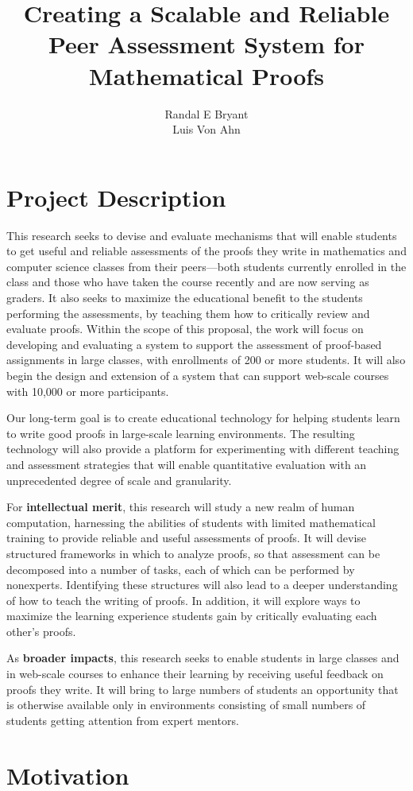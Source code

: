 \documentclass[12pt]{article}
\title{Creating a Scalable and Reliable Peer Assessment System for
  Mathematical Proofs}
\author{Randal E Bryant \\ Luis Von Ahn}
\begin{document}
\section*{Project Description}

This research seeks to devise and evaluate mechanisms that will enable
students to get useful and reliable assessments of the proofs they
write in mathematics and computer science classes from their
peers---both students currently enrolled in the class and those who
have taken the course recently and are now serving as graders.  It
also seeks to maximize the educational benefit to the students
performing the assessments, by teaching them how to critically review
and evaluate proofs.  Within the scope of this proposal, the work will
focus on developing and evaluating a system to support the assessment
of proof-based assignments in large classes, with enrollments of 200
or more students.  It will also begin the design and extension of a
system that can support web-scale courses with 10,000 or more
participants.

Our long-term goal is to create educational technology for helping
students learn to write good proofs in large-scale learning
environments.  The resulting technology will also provide a platform
for experimenting with different teaching and assessment strategies
that will enable quantitative evaluation with an unprecedented
degree of scale and granularity.

For {\bf intellectual merit}, this research will study a new realm of
human computation, harnessing the abilities of students with limited
mathematical training to provide reliable and useful assessments of
proofs.  It will devise structured frameworks in which to analyze
proofs, so that assessment can be decomposed into a number of tasks,
each of which can be performed by nonexperts.  Identifying these
structures will also lead to a deeper understanding of how to teach
the writing of proofs.  In addition, it will explore ways to maximize
the learning experience students gain by critically evaluating each
other's proofs.

As {\bf broader impacts}, this research seeks to enable students in
large classes and in web-scale courses to enhance their learning by
receiving useful feedback on proofs they write.  It will bring to
large numbers of students an opportunity that is otherwise available
only in environments consisting of small numbers of students getting
attention from expert mentors.


\section{Motivation}
\end{document}
